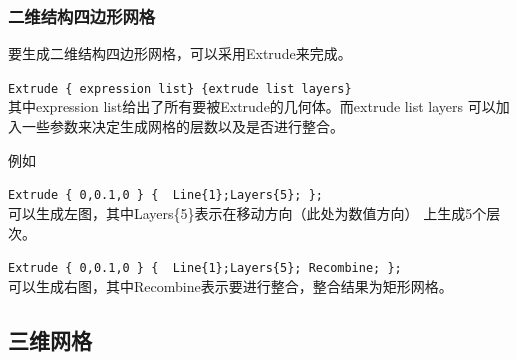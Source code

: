 \documentclass[a4paper,  11pt]{ctexart}
\begin{document}
\subsubsection{二维结构四边形网格}
要生成二维结构四边形网格，可以采用Extrude来完成。\par
\verb|Extrude { expression list} {extrude list layers} |\\
其中expression list给出了所有要被Extrude的几何体。而extrude list
layers 可以加入一些参数来决定生成网格的层数以及是否进行整合。\par
例如\par
	\verb|Extrude { 0,0.1,0 } {  Line{1};Layers{5}; };| \\
	可以生成左图，其中Layers\{5\}表示在移动方向（此处为数值方向）
	上生成5个层次。\par
	\verb|Extrude { 0,0.1,0 } {  Line{1};Layers{5}; Recombine; };| \\
	可以生成右图，其中Recombine表示要进行整合，整合结果为矩形网格。\par
\begin{figure}[H]
	\centering
\end{figure}
\subsection{三维网格}
\end{document}

